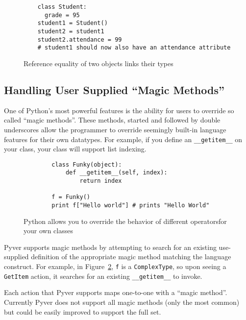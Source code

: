 \documentclass{article}[12pt]
\begin{document}
\begin{figure}
\begin{verbatim}
    class Student:
      grade = 95
    student1 = Student()
    student2 = student1
    student2.attendance = 99
    # student1 should now also have an attendance attribute
\end{verbatim}
\caption{Reference equality of two objects links their types}
\label{fig:mutablestate}
\end{figure}

\subsection{Handling User Supplied ``Magic Methods''}
One of Python's most powerful features is the ability for users to override so called ``magic methods''. These methods,
started and followed by double underscores allow the programmer to override seemingly built-in language features for
their own datatypes. For example, if you define an \texttt{\_\_getitem\_\_} on your class, your class will support list
indexing.
\begin{figure}
    \begin{verbatim}
        class Funky(object):
            def __getitem__(self, index):
                return index

        f = Funky()
        print f["Hello world"] # prints "Hello World"
    \end{verbatim}
    \caption{Python allows you to override the behavior of different operatorsfor your own classes}
    \label{fig:magicmethods}
\end{figure}

Pyver supports magic methods by attempting to search for an existing use-supplied definition of the appropriate magic
method matching the language construct. For example, in Figure~\ref{fig:magicmethods}, \texttt{f} is a \texttt{ComplexType}, so upon seeing a
\texttt{GetItem} action, it searches for an existing \texttt{\_\_getitem\_\_} to invoke.
  
Each action that Pyver supports maps one-to-one with a ``magic method''. Currently Pyver does not support all magic
methods (only the most common) but could be easily improved to support the full set.
\end{document}
